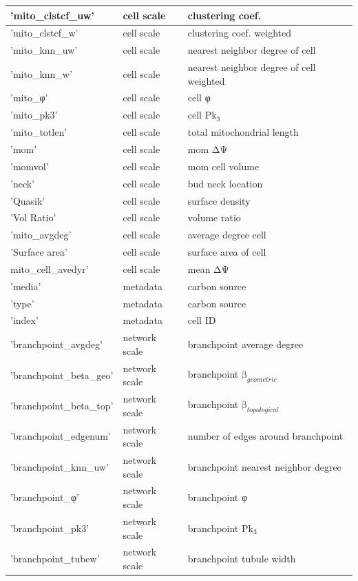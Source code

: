\begin{longtable}{|l|l|l|}
	 'mito\_clstcf\_uw' & cell scale & clustering coef. \\ \hline
	 'mito\_clstcf\_w' & cell scale & clustering coef. weighted \\ \hline
	 'mito\_knn\_uw' & cell scale & nearest neighbor degree of cell \\ \hline
	 'mito\_knn\_w' & cell scale & nearest neighbor degree of cell weighted \\ \hline
	 'mito\_φ' & cell scale & cell φ \\ \hline
	 'mito\_pk3' & cell scale & cell Pk$_3$ \\ \hline
	 'mito\_totlen' & cell scale & total mitochondrial length \\ \hline
	 'mom' & cell scale & mom ΔΨ \\ \hline
	 'momvol' & cell scale & mom cell volume \\ \hline
	 'neck' & cell scale & bud neck location \\ \hline
	 'Quasik' & cell scale & surface density \\ \hline
	 'Vol Ratio' & cell scale & volume ratio \\ \hline
	'mito\_avgdeg' & cell scale & average degree cell \\ \hline
	'Surface area' & cell scale & surface area of cell \\ \hline
	mito\_cell\_avedyr' & cell scale & mean ΔΨ \\ \hline
	 'media' & metadata & carbon source \\ \hline
	 'type' & metadata & carbon source \\ \hline
	'index' & metadata & cell ID \\ \hline
	 'branchpoint\_avgdeg' & network scale & branchpoint average degree \\ \hline
	 'branchpoint\_beta\_geo' & network scale & branchpoint  $\text{β}_{geometric}$ \\ \hline
	 'branchpoint\_beta\_top' & network scale & branchpoint  $\text{β}_{topological}$ \\ \hline
	 'branchpoint\_edgenum' & network scale & number of edges around branchpoint \\ \hline
	 'branchpoint\_knn\_uw' & network scale & branchpoint nearest neighbor degree\\ \hline
	 'branchpoint\_φ' & network scale & branchpoint φ \\ \hline
	 'branchpoint\_pk3' & network scale & branchpoint Pk$_3$ \\ \hline
	 'branchpoint\_tubew' & network scale & branchpoint tubule width \\ \hline

\end{longtable}
